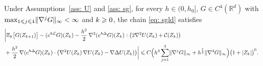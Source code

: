 \begin{lemma}
\label{lem: sgld weak}
    Under Assumptions~\ref{ass: U} and \ref{ass: sg}, for every $h \in (0,h_0]$, $G \in C^4(\mathbb R^d)$ with $\max_{1 \leqslant j \leqslant 4} \lVert \nabla^j G \rVert_\infty < \infty$ and $k \geqslant 0$, the chain \eqref{eq: sgld} satisfies
    \begin{align}
        & \biggl| \mathbb E_k\bigl[ G(Z_{k+1}) \bigr] - (e^{h\mathcal L} G)(Z_k) - \frac{h^2}{2}\, \nabla^2 ( e^{h\Delta} G )(Z_k) : \bigl( 2\nabla^2 U(Z_k) + \mathcal C(Z_k) \bigr) \\
        \label{eq: sgld weak}
        & + \frac{h^2}{2}\, \nabla ( e^{h\Delta} G )(Z_k) \cdot \bigl( \nabla^2 U(Z_k)\, \nabla U(Z_k) - \nabla \Delta U(Z_k) \bigr) \biggr| \leqslant C \Bigl( h^3 \sum_{j=1}^{3} \lVert \nabla^j G \rVert_\infty + h^{\frac72} \lVert \nabla^4 G \rVert_\infty \Bigr) \bigl( 1 + |Z_k| \bigr)^{6} . \notag
    \end{align}
\end{lemma}

